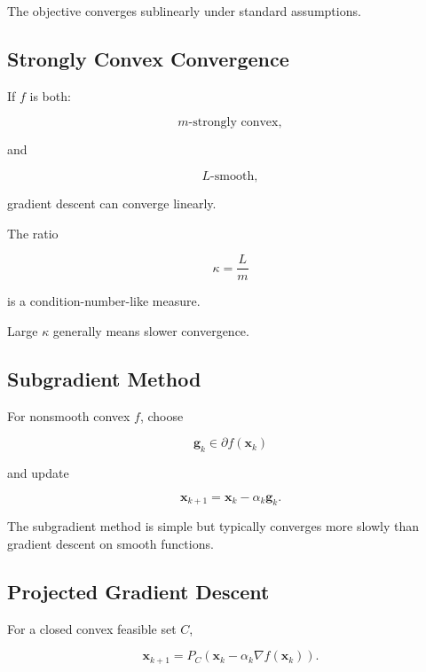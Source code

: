 The objective converges sublinearly under standard assumptions.

\subsection{Strongly Convex Convergence}
\label{subsec:strong-convex-gradient-convergence}

If \(f\) is both:

\[
\boxed{
m\text{-strongly convex},
}
\]

and

\[
\boxed{
L\text{-smooth},
}
\]

gradient descent can converge linearly.

The ratio

\[
\boxed{
\kappa
=
\frac{L}{m}
}
\]

is a condition-number-like measure.

Large \(\kappa\) generally means slower convergence.

\subsection{Subgradient Method}
\label{subsec:subgradient-method}

For nonsmooth convex \(f\), choose

\[
\mathbf{g}_k
\in
\partial f(\mathbf{x}_k)
\]

and update

\[
\boxed{
\mathbf{x}_{k+1}
=
\mathbf{x}_k
-
\alpha_k
\mathbf{g}_k.
}
\]

The subgradient method is simple but typically converges more slowly than
gradient descent on smooth functions.

\subsection{Projected Gradient Descent}
\label{subsec:projected-gradient-descent}

For a closed convex feasible set \(C\),

\[
\boxed{
\mathbf{x}_{k+1}
=
P_C
\left(
\mathbf{x}_k
-
\alpha_k
\nabla f(\mathbf{x}_k)
\right).
}
\]

